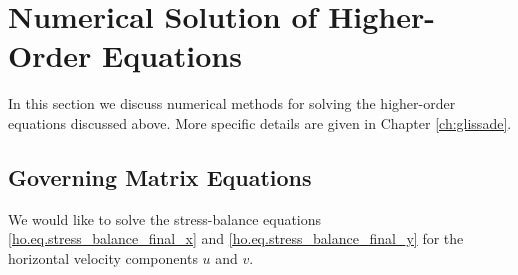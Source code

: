 
\section{Numerical Solution of Higher-Order Equations}
\label{sc:higher-order-numerics}

In this section we discuss numerical methods for solving the higher-order equations discussed above. More specific details are given in Chapter \ref{ch:glissade}.

\subsection{Governing Matrix Equations}
We would like to solve the stress-balance equations \eqref{ho.eq.stress_balance_final_x} and \eqref{ho.eq.stress_balance_final_y} for the
horizontal velocity components $u$ and $v$.
 


